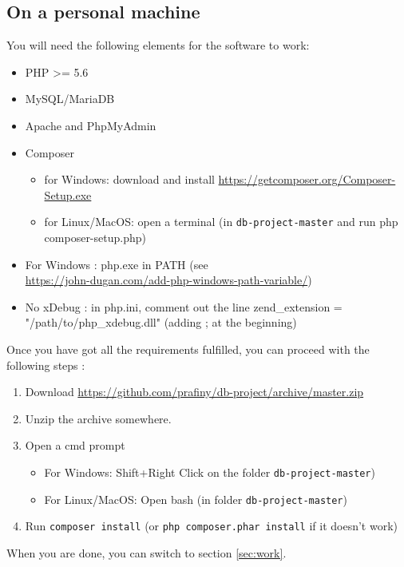 \documentclass[twoside,a4paper,12pt]{article}
\begin{document}
\subsection{On a personal machine}
You will need the following elements for the software to work:
\begin{itemize}
\item PHP >= 5.6
\item MySQL/MariaDB
\item Apache and PhpMyAdmin
\item Composer 
	\begin{itemize}
		\item for Windows: download and install \url{https://getcomposer.org/Composer-Setup.exe}
		\item for Linux/MacOS: open a terminal (in \texttt{db-project-master} and run php composer-setup.php)
	\end{itemize}
\item For Windows : php.exe in PATH (see\\ \url{https://john-dugan.com/add-php-windows-path-variable/})
\item No xDebug : in php.ini, comment out the line zend\_extension = "/path/to/php\_xdebug.dll" (adding ; at the beginning)
\end{itemize}

Once you have got all the requirements fulfilled, you can proceed with the following steps :

\begin{enumerate}
\item Download \url{https://github.com/prafiny/db-project/archive/master.zip}
\item Unzip the archive somewhere.
\item Open a cmd prompt
\begin{itemize}
	\item For Windows: Shift+Right Click on the folder \texttt{db-project-master})
	\item For Linux/MacOS: Open bash (in folder \texttt{db-project-master})
\end{itemize}
\item Run \texttt{composer install} (or \texttt{php composer.phar install} if it doesn't work)
\end{enumerate}

When you are done, you can switch to section \ref{sec:work}.
\end{document}
